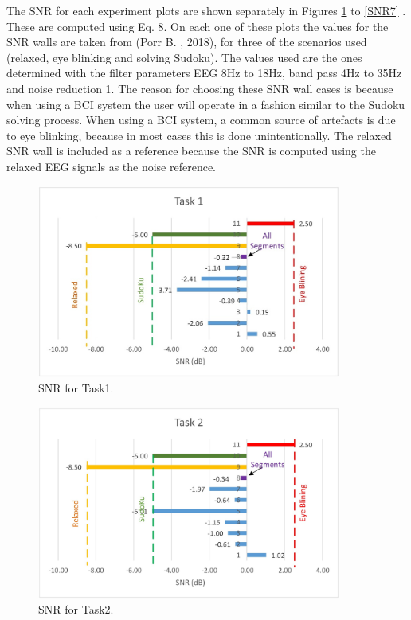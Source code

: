 The SNR for each experiment plots are shown separately in Figures \ref{SNR1} to \ref{SNR7} . These are computed using Eq. 8. On each one of these plots the values for the SNR walls are taken from (Porr B. , 2018), for three of the scenarios used (relaxed, eye blinking and solving Sudoku). The values used are the ones determined with the filter parameters EEG 8Hz to 18Hz, band pass 4Hz to 35Hz and noise reduction 1. The reason for choosing these SNR wall cases is because when using a BCI system the user will operate in a fashion similar to the Sudoku solving process. When using a BCI system, a common source of artefacts is due to eye blinking, because in most cases this is done unintentionally. The relaxed SNR wall is included as a reference because the SNR is computed using the relaxed EEG signals as the noise reference. 

\begin{figure}[hbt!]
	\centering
	\includegraphics[width=10cm]{Figures/SNRtask1.jpg} 
	\caption{SNR for Task1.} 
	\label{SNR1} 
\end{figure}

\begin{figure}[hbt!]
	\centering
	\includegraphics[width=10cm]{Figures/SNRtask2.jpg} 
	\caption{SNR for Task2.} 
	\label{SNR2} 
\end{figure}

